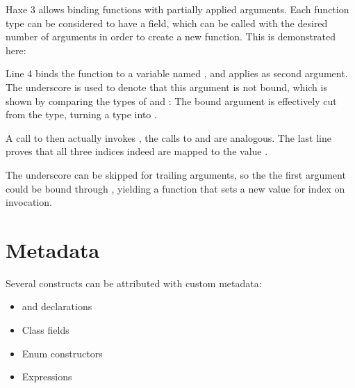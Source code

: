 \documentclass{haxe}
\begin{document}
Haxe 3 allows binding functions with partially applied arguments. Each function type can be considered to have a  field, which can be called with the desired number of arguments in order to create a new function. This is demonstrated here:

Line 4 binds the function  to a variable named , and applies  as second argument. The underscore \expr{_} is used to denote that this argument is not bound, which is shown by comparing the types of  and : The bound  argument is effectively cut from the type, turning a  type into .

A call to  then actually invokes , the calls to  and  are analogous. The last line proves that all three indices indeed are mapped to the value .

The underscore \expr{_} can be skipped for trailing arguments, so the the first argument could be bound through , yielding a  function that sets a new value for index  on invocation.




\section{Metadata}
\label{lf-metadata}

Several constructs can be attributed with custom metadata:

\begin{itemize}
	\item {} and  declarations
	\item Class fields
	\item Enum constructors
	\item Expressions
\end{itemize}
\end{document}
